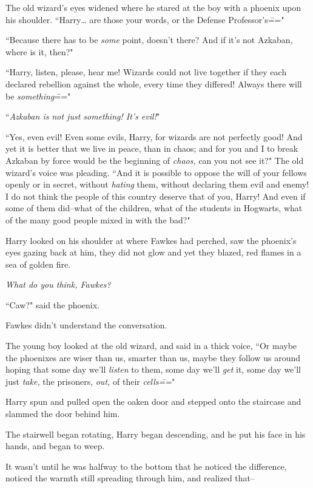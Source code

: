 The old wizard's eyes widened where he stared at the boy with a phoenix upon his shoulder. ``Harry{\ldots} are those your words, or the Defense Professor's\==="

``Because there has to be \emph{some} point, doesn't there? And if it's not Azkaban, where is it, then?"

``Harry, listen, please, hear me! Wizards could not live together if they each declared rebellion against the whole, every time they differed! Always there will be \emph{something}\==="

``\emph{Azkaban is not just something! It's evil!}"

``Yes, even evil! Even some evils, Harry, for wizards are not perfectly good! And yet it is better that we live in peace, than in chaos; and for you and I to break Azkaban by force would be the beginning of \emph{chaos,} can you not see it?" The old wizard's voice was pleading. ``And it is possible to oppose the will of your fellows openly or in secret, without \emph{hating} them, without declaring them evil and enemy! I do not think the people of this country deserve that of you, Harry! And even if some of them did\---what of the children, what of the students in Hogwarts, what of the many good people mixed in with the bad?"

Harry looked on his shoulder at where Fawkes had perched, saw the phoenix's eyes gazing back at him, they did not glow and yet they blazed, red flames in a sea of golden fire.

\emph{What do you think, Fawkes?}

``Caw?" said the phoenix.

Fawkes didn't understand the conversation.

The young boy looked at the old wizard, and said in a thick voice, ``Or maybe the phoenixes are wiser than us, smarter than us, maybe they follow us around hoping that some day we'll \emph{listen} to them, some day we'll \emph{get} it, some day we'll just \emph{take,} the prisoners, \emph{out,} of their \emph{cells\===}"

Harry spun and pulled open the oaken door and stepped onto the staircase and slammed the door behind him.

The stairwell began rotating, Harry began descending, and he put his face in his hands, and began to weep.

It wasn't until he was halfway to the bottom that he noticed the difference, noticed the warmth still spreading through him, and realized that\---

